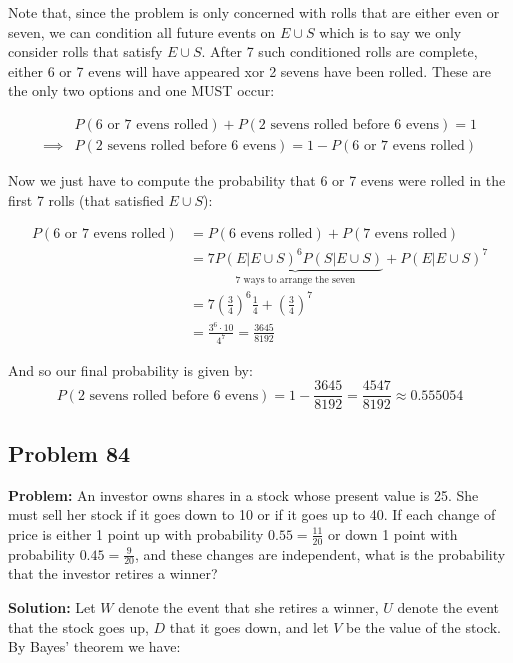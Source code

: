 \documentclass{article}
\begin{document}
Note that, since the problem is only concerned with rolls that are either even or seven, we can condition all future events on $E\cup S$ which is to say we only consider rolls that satisfy $E\cup S$. After 7 such conditioned rolls are complete, either 6 or 7 evens will have appeared xor 2 sevens have been rolled. These are the only two options and one MUST occur:

\begin{align*}
    &P(\text{6 or 7 evens rolled})+P(\text{2 sevens rolled before 6 evens})=1\\
    \implies&P(\text{2 sevens rolled before 6 evens})=1-P(\text{6 or 7 evens rolled})
\end{align*}

Now we just have to compute the probability that 6 or 7 evens were rolled in the first 7 rolls (that satisfied $E\cup S$):

\begin{align*}
    P(\text{6 or 7 evens rolled})&=P(\text{6 evens rolled})+P(\text{7 evens rolled})\\
    &=\underbrace{7P(E|E\cup S)^6P(S|E\cup S)}_{7\text{ ways to arrange the seven}}+P(E|E\cup S)^7\\
    &=7\left(\frac{3}{4}\right)^6\frac{1}{4}+\left(\frac{3}{4}\right)^7\\
    &=\frac{3^6\cdot 10}{4^7}=\frac{3645}{8192}
\end{align*}

And so our final probability is given by:
\begin{equation*}
    P(\text{2 sevens rolled before 6 evens})=1-\frac{3645}{8192}=\frac{4547}{8192}\approx0.555054
\end{equation*}

\subsection*{Problem 84}
\noindent\textbf{Problem:} An investor owns shares in a stock whose present value is 25. She must sell her stock if it goes down to 10 or if it goes up to 40. If each change of price is either 1 point up with probability $0.55=\frac{11}{20}$ or down 1 point with probability $0.45=\frac{9}{20}$, and these changes are independent, what is the probability that the investor retires a winner?
\bigskip

\noindent\textbf{Solution:} Let $W$ denote the event that she retires a winner, $U$ denote the event that the stock goes up, $D$ that it goes down, and let $V$ be the value of the stock. By Bayes' theorem we have:
\end{document}
